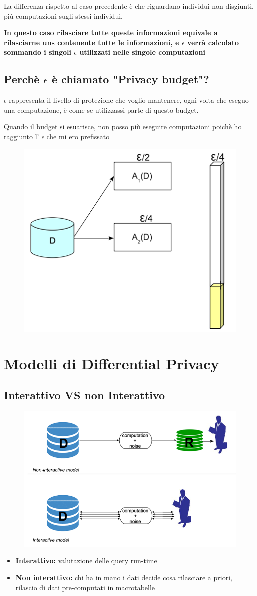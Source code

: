 \documentclass{report}
\begin{document}
\noindent La differenza rispetto al caso precedente è che riguardano individui non disgiunti, più computazioni sugli stessi individui.

\noindent \textbf{In questo caso rilasciare tutte queste informazioni equivale a rilasciarne uns contenente tutte le informazioni, e $\epsilon$ verrà calcolato sommando i singoli $\epsilon$
utilizzati nelle singole computazioni}

\section{Perchè $\epsilon$ è chiamato "Privacy budget"?}
$\epsilon$ rappresenta il livello di protezione che voglio mantenere, ogni volta che eseguo una computazione, è come se utilizzassi parte di questo budget.

\noindent Quando il budget si esuarisce, non posso più eseguire computazioni poichè ho raggiunto l' $\epsilon$ che mi ero prefissato
\begin{figure}[H]
        \centering
        \includegraphics[width=0.4\linewidth]{images/privacyBudget.png}
\end{figure}

\chapter{Modelli di Differential Privacy}

\section{Interattivo VS non Interattivo}
\begin{figure}[H]
        \centering
        \includegraphics[width=0.3\linewidth]{images/Interactive.png}
\end{figure}
\begin{itemize}
    \item \textbf{Interattivo:} valutazione delle query run-time 
    \item \textbf{Non interattivo:} chi ha in mano i dati decide cosa rilasciare a priori, rilascio di dati pre-computati in macrotabelle 
\end{itemize}
\end{document}
